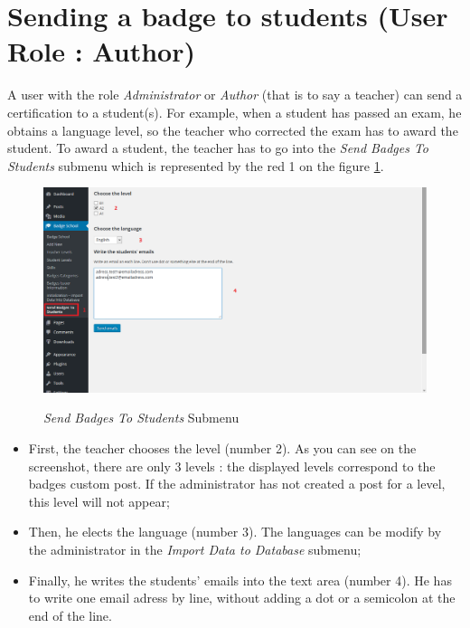 \documentclass[a4paper, 12pt]{report}
\begin{document}
		\section{Sending a badge to students (User Role : Author)}
		
	A user with the role \textit{Administrator} or \textit{Author} (that is to say a teacher) can send a certification to a student(s). For example, when a student has passed an exam, he obtains a language level, so the teacher who corrected the exam has to award the student. To award a student, the teacher has to go into the \textit{Send Badges To Students} submenu which is represented by the red 1 on the figure \ref{sendBadgesToStudents}.
	
	\begin{figure}[h]
		\caption{\textit{Send Badges To Students} Submenu}
		\includegraphics[scale=0.45]{includes/sendBadgesToStudents}
		\label{sendBadgesToStudents}
	\end{figure}
	
	\begin{itemize}
		\item First, the teacher chooses the level (number 2). As you can see on the screenshot, there are only 3 levels : the displayed levels correspond to the badges custom post. If the administrator has not created a post for a level, this level will not appear;
		\item Then, he elects the language (number 3). The languages can be modify by the administrator in the \textit{Import Data to Database} submenu;
		\item Finally, he writes the students' emails into the text area (number 4). He has to write one email adress by line, without adding a dot or a semicolon at the end of the line.
	\end{itemize}
		
\end{document}
